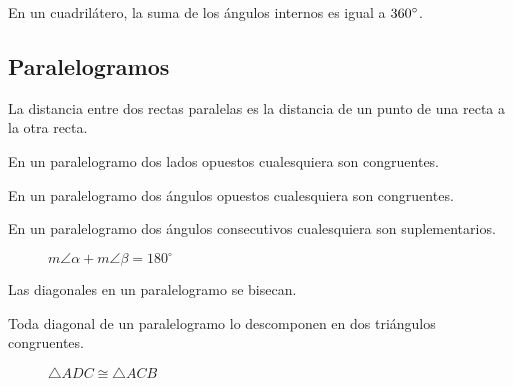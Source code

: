 \begin{theorem}
    En un cuadrilátero, la suma de los ángulos internos es igual a $360^{\circ}$.
\end{theorem}

\clearpage

\subsection{Paralelogramos}

    \begin{definition}
    La distancia entre dos rectas paralelas es la distancia de un punto de una recta a la otra recta.
\end{definition}

\begin{theorem}
    En un paralelogramo dos lados opuestos cualesquiera son congruentes.
\end{theorem}

\begin{theorem}
    En un paralelogramo dos ángulos opuestos cualesquiera son congruentes.
\end{theorem}

\begin{figure}[!h]
    \centering
    
    \label{fig:theorem10}
\end{figure}

\begin{theorem}
    En un paralelogramo dos ángulos consecutivos cualesquiera son suplementarios.

    \begin{figure}[!h]
        \centering
        
        \caption{$m\angle{\alpha} + m\angle{\beta} = 180^{\circ}$}
        \label{fig:theorem11}
    \end{figure}
    
\end{theorem}

\begin{theorem}
    Las diagonales en un paralelogramo se bisecan.

    \begin{figure}[!h]
        \centering
        
        \label{fig:theorem12}
    \end{figure}
    
\end{theorem}

\begin{theorem}
    Toda diagonal de un paralelogramo lo descomponen en dos triángulos congruentes.
    
    \begin{figure}[!h]
        \centering
        
        \caption{$\triangle{ADC} \cong \triangle{ACB}$}
        \label{fig:theorem13}
    \end{figure}
    
\end{theorem}

